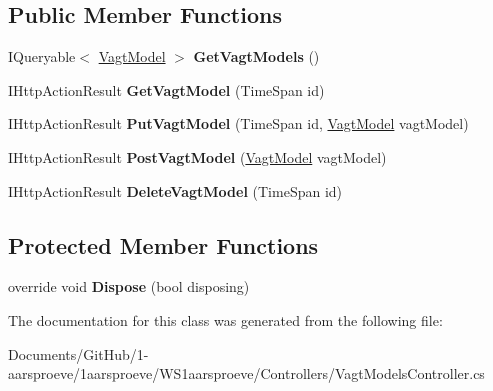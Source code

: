 \subsection*{Public Member Functions}
\begin{DoxyCompactItemize}
\item 
\hypertarget{class_w_s1aarsproeve_1_1_controllers_1_1_vagt_models_controller_a919ecad95e0d0b5f0ca5031f03312cf2}{}I\+Queryable$<$ \hyperlink{class_w_s1aarsproeve_1_1_vagt_model}{Vagt\+Model} $>$ {\bfseries Get\+Vagt\+Models} ()\label{class_w_s1aarsproeve_1_1_controllers_1_1_vagt_models_controller_a919ecad95e0d0b5f0ca5031f03312cf2}

\item 
\hypertarget{class_w_s1aarsproeve_1_1_controllers_1_1_vagt_models_controller_a2d0753b09ab44b3208c0d03bd272aed2}{}I\+Http\+Action\+Result {\bfseries Get\+Vagt\+Model} (Time\+Span id)\label{class_w_s1aarsproeve_1_1_controllers_1_1_vagt_models_controller_a2d0753b09ab44b3208c0d03bd272aed2}

\item 
\hypertarget{class_w_s1aarsproeve_1_1_controllers_1_1_vagt_models_controller_ac8898d954d2ff287fd8e218d60310777}{}I\+Http\+Action\+Result {\bfseries Put\+Vagt\+Model} (Time\+Span id, \hyperlink{class_w_s1aarsproeve_1_1_vagt_model}{Vagt\+Model} vagt\+Model)\label{class_w_s1aarsproeve_1_1_controllers_1_1_vagt_models_controller_ac8898d954d2ff287fd8e218d60310777}

\item 
\hypertarget{class_w_s1aarsproeve_1_1_controllers_1_1_vagt_models_controller_a8f8e844c79353f5f0bca1be9b40adb87}{}I\+Http\+Action\+Result {\bfseries Post\+Vagt\+Model} (\hyperlink{class_w_s1aarsproeve_1_1_vagt_model}{Vagt\+Model} vagt\+Model)\label{class_w_s1aarsproeve_1_1_controllers_1_1_vagt_models_controller_a8f8e844c79353f5f0bca1be9b40adb87}

\item 
\hypertarget{class_w_s1aarsproeve_1_1_controllers_1_1_vagt_models_controller_a474c7bfc313468931fe6ea3f885eaf73}{}I\+Http\+Action\+Result {\bfseries Delete\+Vagt\+Model} (Time\+Span id)\label{class_w_s1aarsproeve_1_1_controllers_1_1_vagt_models_controller_a474c7bfc313468931fe6ea3f885eaf73}

\end{DoxyCompactItemize}
\subsection*{Protected Member Functions}
\begin{DoxyCompactItemize}
\item 
\hypertarget{class_w_s1aarsproeve_1_1_controllers_1_1_vagt_models_controller_a0986677b4f08a28025c66aea59d09b88}{}override void {\bfseries Dispose} (bool disposing)\label{class_w_s1aarsproeve_1_1_controllers_1_1_vagt_models_controller_a0986677b4f08a28025c66aea59d09b88}

\end{DoxyCompactItemize}


The documentation for this class was generated from the following file\+:\begin{DoxyCompactItemize}
\item 
Documents/\+Git\+Hub/1-\/aarsproeve/1aarsproeve/\+W\+S1aarsproeve/\+Controllers/Vagt\+Models\+Controller.\+cs\end{DoxyCompactItemize}
